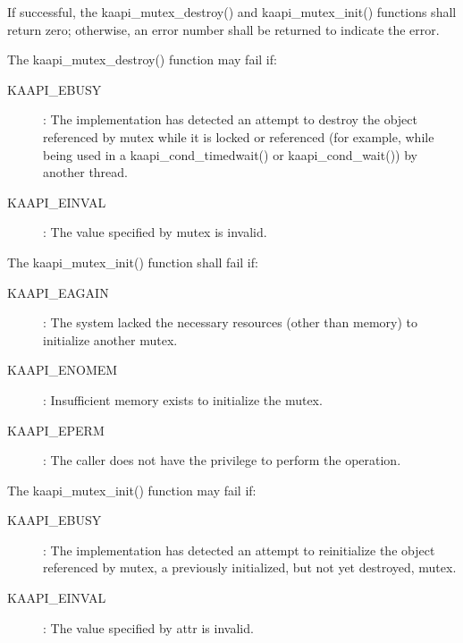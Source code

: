 \begin{description}
If successful, the kaapi\_mutex\_destroy() and kaapi\_mutex\_init() functions
shall return zero; otherwise, an error number shall be returned to indicate
the error.

The kaapi\_mutex\_destroy() function may fail if:

\begin{description}
\item [KAAPI\_EBUSY]: The implementation has detected an attempt to destroy
  the object referenced by mutex while it is locked or referenced (for
  example, while being used in a kaapi\_cond\_timedwait() or
  kaapi\_cond\_wait()) by another thread.
\item [KAAPI\_EINVAL]: The value specified by mutex is invalid.
\end{description}

The kaapi\_mutex\_init() function shall fail if:

\begin{description}
\item [KAAPI\_EAGAIN]: The system lacked the necessary resources (other than
  memory) to initialize another mutex.
\item [KAAPI\_ENOMEM]: Insufficient memory exists to initialize the mutex.
\item [KAAPI\_EPERM]: The caller does not have the privilege to perform the
  operation.
\end{description}

The kaapi\_mutex\_init() function may fail if:

\begin{description}
\item [KAAPI\_EBUSY]: The implementation has detected an attempt to
  reinitialize the object referenced by mutex, a previously initialized, but
  not yet destroyed, mutex.
\item [KAAPI\_EINVAL]: The value specified by attr is invalid.
\end{description}
\end{description}


